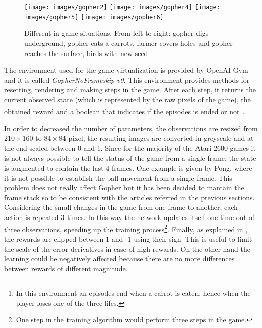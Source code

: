 \documentclass[article,11pt]{article}
\begin{document}
	\begin{figure}
		\texttt{[image: images/gopher2]}
		\endminipage\hfill
		\texttt{[image: images/gopher4]}
		\endminipage\hfill
		\texttt{[image: images/gopher5]}
		\endminipage\hfill
		\texttt{[image: images/gopher6]}
		\endminipage
		\caption{Different in game situations. From left to right: gopher digs underground, gopher eats a carrots, farmer covers holes and gopher reaches the surface, birds with new seed.}
		\label{fig:gopher}
	\end{figure}	

	The environment used for the game virtualization is provided by OpenAI Gym and it is called \textit{GopherNoFrameskip-v0}. This environment provides methods for resetting, rendering and making steps in the game. After each step, it returns the current observed state (which is represented by the raw pixels of the game), the obtained reward and a boolean that indicates if the episodes is ended or not\footnote{In this environment an episodes end when a carrot is eaten, hence when the player loses one of the three lifes.}.
	
	In order to decreased the number of parameters, the observations are resized from $210\times160$ to $84\times84$ pixel, the resulting images are converted in greyscale and at the end scaled between 0 and 1.
	Since for the majority of the Atari 2600 games it is not always possible to tell the status of the game from a single frame, the state is augmented to contain the last 4 frames. One example is given by Pong, where it is not possible to establish the ball movement from a single frame. This problem does not really affect Gopher but it has been decided to mantain the frame stack so to be consistent with the articles referred in the previous sections.
	Considering the small changes in the game from one frame to another, each action is repeated 3 times. In this way the network updates itself one time out of three observations, speeding up the training process\footnote{One step in the training algorithm would perform three steps in the game.}.
	Finally, as explained in \cite{dqn2013}, the rewards are clipped between 1 and -1 using their sign. This is useful to limit the scale of the error derivatives in case of high rewards. On the other hand the learning could be negatively affected because there are no more differences between rewards of different magnitude.
	
\end{document}
